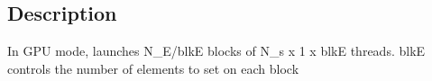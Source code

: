 \subsection{Description}\label{scalar__def_8h_Description}
In G\-P\-U mode, launches N\-\_\-\-E/blk\-E blocks of N\-\_\-s x 1 x blk\-E threads. blk\-E controls the number of elements to set on each block